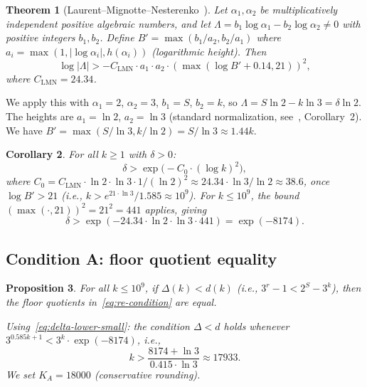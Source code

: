 \documentclass[11pt, a4paper]{amsart}
\theoremstyle{plain}
\newtheorem{theorem}{Theorem}[section]
\newtheorem{proposition}[theorem]{Proposition}
\newtheorem{corollary}[theorem]{Corollary}
\theoremstyle{definition}
\theoremstyle{remark}
\begin{document}
\begin{theorem}[Laurent--Mignotte--Nesterenko~\cite{LMN1995}]
  \label{thm:lmn}
  Let $\alpha_1, \alpha_2$ be multiplicatively independent
  positive algebraic numbers, and let
  $\Lambda = b_1 \log \alpha_1 - b_2 \log \alpha_2 \neq 0$
  with positive integers $b_1, b_2$.
  Define $B' = \max(b_1/a_2, b_2/a_1)$ where
  $a_i = \max(1, |\log \alpha_i|, h(\alpha_i))$
  (logarithmic height).
  Then
  \begin{equation}\label{eq:lmn-full}
    \log|\Lambda| > -C_{\mathrm{LMN}} \cdot a_1 \cdot a_2
    \cdot (\max(\log B' + 0.14, 21))^2,
  \end{equation}
  where $C_{\mathrm{LMN}} = 24.34$.
\end{theorem}

We apply this with $\alpha_1 = 2$, $\alpha_2 = 3$,
$b_1 = S$, $b_2 = k$, so
$\Lambda = S \ln 2 - k \ln 3 = \delta \ln 2$.
The heights are $a_1 = \ln 2$, $a_2 = \ln 3$ (standard
normalization, see~\cite{LMN1995}, Corollary~2).
We have $B' = \max(S/\ln 3, k/\ln 2) = S/\ln 3 \approx
1.44k$.

\begin{corollary}\label{cor:delta-bound}
  For all $k \geq 1$ with $\delta > 0$:
  \begin{equation}\label{eq:delta-lower}
    \delta > \exp\!\big(-C_0 \cdot (\log k)^2\big),
  \end{equation}
  where $C_0 = C_{\mathrm{LMN}} \cdot \ln 2 \cdot \ln 3
  \cdot 1 / (\ln 2)^2 \approx 24.34 \cdot \ln 3 / \ln 2
  \approx 38.6$, once $\log B' > 21$ (i.e., $k > e^{21 \cdot \ln 3}
  / 1.585 \approx 10^9$).  For $k \leq 10^9$, the bound
  $(\max(\cdot, 21))^2 = 21^2 = 441$ applies, giving
  \begin{equation}\label{eq:delta-lower-small}
    \delta > \exp(-24.34 \cdot \ln 2 \cdot \ln 3 \cdot 441)
    = \exp(-8174).
  \end{equation}
\end{corollary}

\subsection{Condition A: floor quotient equality}
\label{ssec:condition-a}

\begin{proposition}\label{prop:cond-a}
  For all $k \leq 10^9$, if $\Delta(k) < d(k)$
  (i.e., $3^r - 1 < 2^S - 3^k$), then the floor quotients
  in~\eqref{eq:re-condition} are equal.

  Using~\eqref{eq:delta-lower-small}: the condition
  $\Delta < d$ holds whenever
  $3^{0.585k+1} < 3^k \cdot \exp(-8174)$, i.e.,
  \begin{equation}\label{eq:KA}
    k > \frac{8174 + \ln 3}{0.415 \cdot \ln 3}
    \approx 17933.
  \end{equation}
  We set $K_A = 18000$ (conservative rounding).
\end{proposition}
\end{document}
